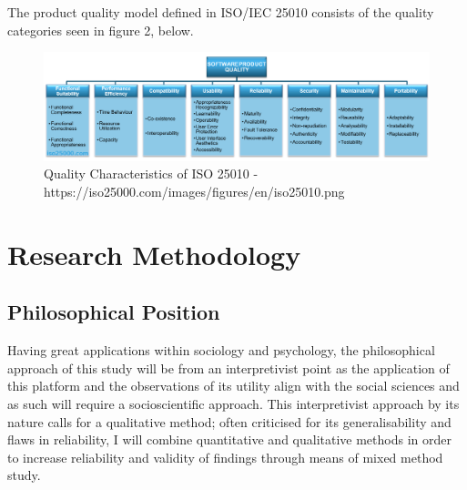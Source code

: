 \documentclass[lettersize,journal]{IEEEtran}
\begin{document}
	The product quality model defined in ISO/IEC 25010 consists of the quality categories seen in figure 2, below.

	\begin{figure}[h!]
		\includegraphics[width=\linewidth]{iso.png}
		\caption{Quality Characteristics of ISO 25010 - https://iso25000.com/images/figures/en/iso25010.png}
		\label{figure 2}
	\end{figure}



\section{Research Methodology}

	\subsection{Philosophical Position}
	Having great applications within sociology and psychology, the philosophical approach of this study will be from an
	interpretivist point as the application of this platform and the observations of its utility align with the social
	 sciences and as such will require a socioscientific approach. This interpretivist approach by its nature calls for a qualitative
	 method; often criticised for its generalisability and flaws in reliability, I will combine quantitative and qualitative methods
	 in order to increase reliability and validity of findings through means of mixed method study.
\end{document}

